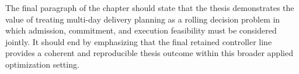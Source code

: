 
The final paragraph of the chapter should state that the thesis demonstrates the value of treating multi-day delivery planning as a rolling decision problem in which admission, commitment, and execution feasibility must be considered jointly. It should end by emphasizing that the final retained controller line provides a coherent and reproducible thesis outcome within this broader applied optimization setting.


